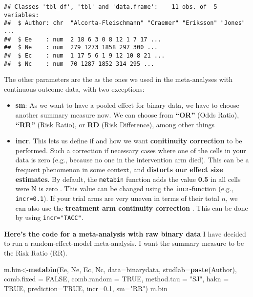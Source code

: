 \documentclass[]{book}
\newenvironment{Shaded}{\begin{snugshade}}{\end{snugshade}}
\newcommand{\KeywordTok}[1]{\textcolor[rgb]{0.13,0.29,0.53}{\textbf{#1}}}
\newcommand{\DataTypeTok}[1]{\textcolor[rgb]{0.13,0.29,0.53}{#1}}
\newcommand{\FloatTok}[1]{\textcolor[rgb]{0.00,0.00,0.81}{#1}}
\newcommand{\StringTok}[1]{\textcolor[rgb]{0.31,0.60,0.02}{#1}}
\newcommand{\OtherTok}[1]{\textcolor[rgb]{0.56,0.35,0.01}{#1}}
\newcommand{\NormalTok}[1]{#1}
\providecommand{\tightlist}{%
  \setlength{\itemsep}{0pt}\setlength{\parskip}{0pt}}
\theoremstyle{definition}
\theoremstyle{definition}
\theoremstyle{definition}
\theoremstyle{remark}
\begin{document}
\begin{verbatim}
## Classes 'tbl_df', 'tbl' and 'data.frame':    11 obs. of  5 variables:
##  $ Author: chr  "Alcorta-Fleischmann" "Craemer" "Eriksson" "Jones" ...
##  $ Ee    : num  2 18 6 3 0 8 12 1 7 17 ...
##  $ Ne    : num  279 1273 1858 297 300 ...
##  $ Ec    : num  1 17 5 6 1 9 12 10 8 21 ...
##  $ Nc    : num  70 1287 1852 314 295 ...
\end{verbatim}

The other parameters are the as the ones we used in the meta-analyses
with continuous outcome data, with two exceptions:

\begin{itemize}
\tightlist
\item
  \textbf{sm}: As we want to have a pooled effect for binary data, we
  have to choose another summary measure now. We can choose from
  \textbf{``OR''} (Odds Ratio), \textbf{``RR''} (Risk Ratio), or
  \textbf{RD} (Risk Difference), among other things
\item
  \textbf{incr}. This lets us define if and how we want
  \textbf{conitinuity correction} to be performed. Such a correction if
  necessary cases where one of the cells in your data is zero (e.g.,
  because no one in the intervention arm died). This can be a frequent
  phenomenon in some context, and \textbf{distorts our effect size
  estimates}. By default, the \texttt{metabin} function adds the value
  \textbf{0.5} in all cells were N is zero \citep{gart1967bias}. This
  value can be changed using the \texttt{incr}-function (e.g.,
  \texttt{incr=0.1}). If your trial arms are very uneven in terms of
  their total \(n\), we can also use the \textbf{treatment arm
  continuity correction} \citep{j2004add}. This can be done by using
  \texttt{incr="TACC"}.
\end{itemize}

\textbf{Here's the code for a meta-analysis with raw binary data} I have
decided to run a random-effect-model meta-analysis. I want the summary
measure to be the Risk Ratio (RR).

\begin{Shaded}
\begin{Highlighting}[]
\NormalTok{m.bin<-}\KeywordTok{metabin}\NormalTok{(Ee,}
\NormalTok{        Ne,}
\NormalTok{        Ec,}
\NormalTok{        Nc,}
        \DataTypeTok{data=}\NormalTok{binarydata,}
        \DataTypeTok{studlab=}\KeywordTok{paste}\NormalTok{(Author),}
        \DataTypeTok{comb.fixed =} \OtherTok{FALSE}\NormalTok{,}
        \DataTypeTok{comb.random =} \OtherTok{TRUE}\NormalTok{,}
        \DataTypeTok{method.tau =} \StringTok{"SJ"}\NormalTok{,}
        \DataTypeTok{hakn =} \OtherTok{TRUE}\NormalTok{,}
        \DataTypeTok{prediction=}\OtherTok{TRUE}\NormalTok{,}
        \DataTypeTok{incr=}\FloatTok{0.1}\NormalTok{,}
        \DataTypeTok{sm=}\StringTok{"RR"}\NormalTok{)}
\NormalTok{m.bin}
\end{Highlighting}
\end{Shaded}
\end{document}
